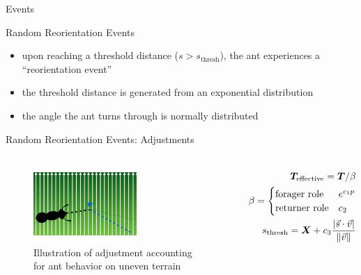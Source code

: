 \begin{subsection}{Events}
\begin{frame}{Random Reorientation Events \scriptsize{\cite{khuong_how_2013}}}
\begin{figure}
\end{figure}
\vspace{-6ex}
\begin{itemize}
    \item upon reaching a threshold distance ($s > s_{\operatorname{thresh}}$), the ant experiences a ``reorientation event''
    \item the threshold distance is generated from an exponential distribution %
    \item the angle the ant turns through is normally distributed %
\end{itemize}
\end{frame}

\begin{frame}{Random Reorientation Events: Adjustments}
\begin{columns}[T,onlytextwidth]

\begin{figure}
\includegraphics[width=0.6\textwidth]{images/model_components_cartoons_012}
\vspace{-2ex}
\caption{
\footnotesize{Illustration of adjustment accounting for ant behavior on uneven terrain}}
\end{figure}
\begin{align*}
\bm{T}_{\operatorname{effective}} = \bm{T} / \beta \\
\beta =
\begin{cases}
      \text{forager role} & e^{c_1p} \\
      \text{returner role} & c_2
\end{cases} \\
s_{\operatorname{thresh}} = \bm{X} + c_3 \frac{|\vec{s} \cdot \vec{v}|}{\lVert\vec{v}\rVert}
\end{align*}


\end{columns}
\end{frame}
\end{subsection}

